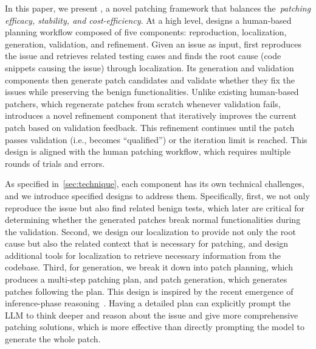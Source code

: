 In this paper, we present \sys, a novel patching framework that balances the~\textit{patching efficacy, stability, and cost-efficiency}. 
At a high level, \sys designs a human-based planning workflow composed of five components: reproduction, localization, generation, validation, and refinement.
Given an issue as input, \sys first reproduces the issue and retrieves related testing cases and finds the root cause (code snippets causing the issue) through localization. 
Its generation and validation components then generate patch candidates and validate whether they fix the issues while preserving the benign functionalities. 
Unlike existing human-based patchers\cite{xia2024agentless}, which regenerate patches from scratch whenever validation fails, \sys introduces a novel refinement component that iteratively improves the current patch based on validation feedback. This refinement continues until the patch passes validation (i.e., becomes “qualified”) or the iteration limit is reached.
This design is aligned with the human patching workflow, which requires multiple rounds of trials and errors. 

As specified in~\cref{sec:technique}, each component has its own technical challenges, and we introduce specified designs to address them. 
Specifically, first, we not only reproduce the issue but also find related benign tests, which later are critical for determining whether the generated patches break normal functionalities during the validation.
Second, we design our localization to provide not only the root cause but also the related context that is necessary for patching, and design additional tools for localization to retrieve necessary information from the codebase.
Third, for generation, we break it down into patch planning, which produces a multi-step patching plan, and patch generation, which generates patches following the plan.
This design is inspired by the recent emergence of inference-phase reasoning~\cite{wei2022chain,yao2024tree,yang2024buffer}. 
Having a detailed plan can explicitly prompt the LLM to think deeper and reason about the issue and give more comprehensive patching solutions, which is more effective than directly prompting the model to generate the whole patch.   

